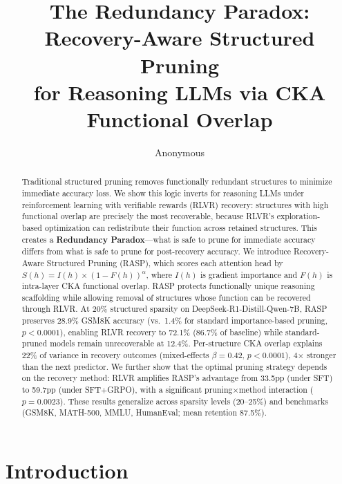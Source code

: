 \documentclass[11pt]{article}
\title{The Redundancy Paradox: Recovery-Aware Structured Pruning\\for Reasoning LLMs via CKA Functional Overlap}
\author{Anonymous}
\date{}
\begin{document}
\maketitle

\begin{abstract}
Traditional structured pruning removes functionally redundant structures to minimize immediate accuracy loss.
We show this logic inverts for reasoning LLMs under reinforcement learning with verifiable rewards (RLVR) recovery: structures with high functional overlap are precisely the most recoverable, because RLVR's exploration-based optimization can redistribute their function across retained structures.
This creates a \textbf{Redundancy Paradox}---what is safe to prune for immediate accuracy differs from what is safe to prune for post-recovery accuracy.
We introduce Recovery-Aware Structured Pruning (RASP), which scores each attention head by $S(h) = I(h) \times (1 - F(h))^\alpha$, where $I(h)$ is gradient importance and $F(h)$ is intra-layer CKA functional overlap.
RASP protects functionally unique reasoning scaffolding while allowing removal of structures whose function can be recovered through RLVR.
At 20\% structured sparsity on DeepSeek-R1-Distill-Qwen-7B, RASP preserves 28.9\% GSM8K accuracy (vs.\ 1.4\% for standard importance-based pruning, $p < 0.0001$), enabling RLVR recovery to 72.1\% (86.7\% of baseline) while standard-pruned models remain unrecoverable at 12.4\%.
Per-structure CKA overlap explains 22\% of variance in recovery outcomes (mixed-effects $\beta = 0.42$, $p < 0.0001$), 4$\times$ stronger than the next predictor.
We further show that the optimal pruning strategy depends on the recovery method: RLVR amplifies RASP's advantage from 33.5pp (under SFT) to 59.7pp (under SFT+GRPO), with a significant pruning$\times$method interaction ($p = 0.0023$).
These results generalize across sparsity levels (20--25\%) and benchmarks (GSM8K, MATH-500, MMLU, HumanEval; mean retention 87.5\%).
\end{abstract}

\section{Introduction}
\label{sec:intro}
\end{document}
